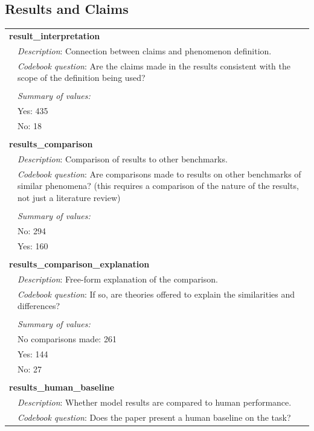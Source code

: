 \subsection{Results and \textcolor{claims}{Claims}}
{\small\begin{longtable}{p{}p{}}
\multicolumn{2}{l}{\textbf{result\_interpretation}} \\
& \textit{Description}: Connection between claims and phenomenon definition. \\
& \textit{Codebook question}: Are the claims made in the results consistent with the scope of the definition being used? \\
\\
& \textit{Summary of values:} \\
& Yes: 435 \\
& No: 18 \\
\\
\multicolumn{2}{l}{\textbf{results\_comparison}} \\
& \textit{Description}: Comparison of results to other benchmarks. \\
& \textit{Codebook question}: Are comparisons made to results on other benchmarks of similar phenomena? (this requires a comparison of the nature of the results, not just a literature review) \\
\\
& \textit{Summary of values:} \\
& No: 294 \\
& Yes: 160 \\
\\
\multicolumn{2}{l}{\textbf{results\_comparison\_explanation}} \\
& \textit{Description}: Free-form explanation of the comparison. \\
& \textit{Codebook question}: If so, are theories offered to explain the similarities and differences? \\
\\
& \textit{Summary of values:} \\
& No comparisons made: 261 \\
& Yes: 144 \\
& No: 27 \\
\\
\multicolumn{2}{l}{\textbf{results\_human\_baseline}} \\
& \textit{Description}: Whether model results are compared to human performance. \\
& \textit{Codebook question}: Does the paper present a human baseline on the task? \\

\end{longtable}}
